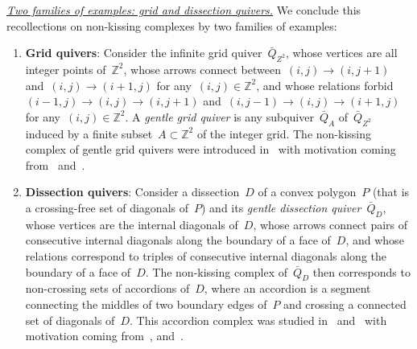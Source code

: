 \documentclass{amsart}
\theoremstyle{definition}
\newcommand{\Z}{\mathbb{Z}} %
\newcommand{\darkblue}{\color{darkblue}} %
\newcommand{\defn}[1]{\textsl{\darkblue #1}} %
\newcommand{\para}[1]{\medskip\noindent\uline{\textit{#1.}}} %
\newcommand{\quiver}{\bar Q} %
\begin{document}
\para{Two families of examples: grid and dissection quivers}
%
We conclude this recollections on non-kissing complexes by two families of examples:
\begin{enumerate}[(1)]
\item \textbf{Grid quivers}: Consider the infinite grid quiver~$\quiver_{Z^2}$, whose vertices are all integer points of~$\Z^2$, whose arrows connect between~$(i,j) \longrightarrow (i,j+1)$ and~$(i,j) \longrightarrow (i+1,j)$ for any~$(i,j) \in \Z^2$, and whose relations forbid~$(i-1,j) \longrightarrow (i,j) \longrightarrow (i,j+1)$ and~$(i,j-1) \longrightarrow (i,j) \longrightarrow (i+1,j)$ for any~$(i,j) \in \Z^2$. A \defn{gentle grid quiver} is any subquiver~$\quiver_A$ of~$\quiver_{Z^2}$ induced by a finite subset~$A \subset \Z^2$ of the integer grid. The non-kissing complex of gentle grid quivers were introduced in~\cite{McConville} with motivation coming from~\cite{PetersenPylyavskyySpeyer} and~\cite{SantosStumpWelker}. 

\smallskip
\item \textbf{Dissection quivers}: Consider a dissection~$D$ of a convex polygon~$P$ (that is a crossing-free set of diagonals of~$P$) and its \defn{gentle dissection quiver}~$\quiver_D$, whose vertices are the internal diagonals of~$D$, whose arrows connect pairs of consecutive internal diagonals along the boundary of a face of~$D$, and whose relations correspond to triples of consecutive internal diagonals along the boundary of a face of~$D$. The non-kissing complex of~$\quiver_D$ then corresponds to non-crossing sets of accordions of~$D$, where an accordion is a segment connecting the middles of two boundary edges of~$P$ and crossing a connected set of diagonals of~$D$. This accordion complex was studied in~\cite{GarverMcConville} and~\cite{MannevillePilaud-accordion} with motivation coming from~\cite{Baryshnikov}, and~\cite{Chapoton-quadrangulations}.
\end{enumerate}
\end{document}
